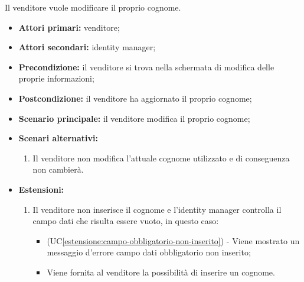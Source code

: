\label{modifica-informazioni-venditore.cognome}

Il venditore vuole modificare il proprio cognome.
\begin{itemize}
	\item \textbf{Attori primari:} venditore;
	\item \textbf{Attori secondari:} identity manager;
	\item \textbf{Precondizione:} il venditore si trova nella schermata di modifica delle proprie informazioni;
	\item \textbf{Postcondizione:} il venditore ha aggiornato il proprio cognome;
	\item \textbf{Scenario principale:} il venditore modifica il proprio cognome;
	\item \textbf{Scenari alternativi:}
	\begin{enumerate}[label=\lett]
		\item Il venditore non modifica l'attuale cognome utilizzato e di conseguenza non cambierà.
	\end{enumerate}
	\item \textbf{Estensioni:}
	\begin{enumerate}[label=\lett]
		\item Il venditore non inserisce il cognome e l'identity manager controlla il campo dati che risulta essere vuoto, in questo caso:
		\begin{itemize}
			\item (UC\ref{estensione:campo-obbligatorio-non-inserito}) - Viene mostrato un messaggio d'errore campo dati obbligatorio non inserito;
			\item Viene fornita al venditore la possibilità di inserire un cognome.
		\end{itemize}
	\end{enumerate} 
\end{itemize}

\label{modifica-informazioni-venditore.email}


